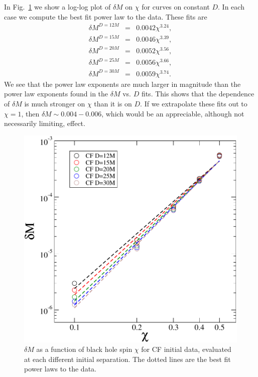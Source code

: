 In Fig.~\ref{fig:MvsS} we show a log-log plot of $\delta M$ on $\chi$ for curves on constant $D$. In each case we compute the best fit power law to the data. These fits are
\begin{eqnarray*}
\delta M^{D=12M} &=& 0.0042\chi^{3.24}, \\
\delta M^{D=15M} &=& 0.0046\chi^{3.39}, \\
\delta M^{D=20M} &=& 0.0052\chi^{3.56}, \\
\delta M^{D=25M} &=& 0.0056\chi^{3.66}, \\
\delta M^{D=30M} &=& 0.0059\chi^{3.74}.
\end{eqnarray*}
We see that the power law exponents are much larger in magnitude than the power law exponents found in the $\delta M$ vs. $D$ fits. This shows that the dependence of $\delta M$ is much stronger on $\chi$ than it is on $D$. If we extrapolate these fits out to $\chi=1$, then $\delta M \sim 0.004-0.006$, which would be an appreciable, although not necessarily limiting, effect.

\begin{figure}[!htbp]
\includegraphics[scale=0.95]{chap5/MvsS2}
 \caption[$\delta M$ as a function of black hole spin $\chi$.]{$\delta M$ as a function of black hole spin $\chi$ for CF
    initial data, evaluated at each different initial separation. The dotted lines are the best fit power laws to the data.}
  \label{fig:MvsS}
\end{figure}


